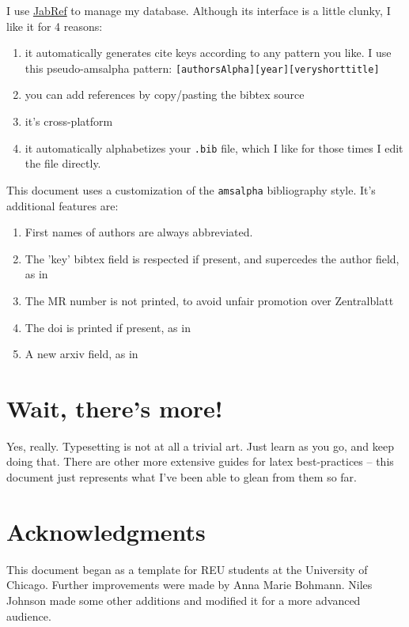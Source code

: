 \documentclass[11pt,oneside,draft]{amsart}
\begin{document}
I use \href{http://jabref.sourceforge.net/}{JabRef} to manage my
database.  Although its interface is a little clunky, I like it for 4 reasons:
\begin{enumerate}
\item it automatically generates cite keys according to any pattern
  you like.  I use this pseudo-amsalpha pattern: \texttt{[authorsAlpha][year][veryshorttitle]}
\item you can add references by copy/pasting the bibtex source
\item it's cross-platform
\item it automatically alphabetizes your \texttt{.bib} file, which I
  like for those times I edit the file directly.
\end{enumerate}

This document uses a customization of the \texttt{amsalpha}
bibliography style.  It's additional features are:
\begin{enumerate}
\item First names of authors are always abbreviated.
\item The 'key' bibtex field is respected if present, and supercedes
  the author field, as in \cite{ATC,Sage}
\item The MR number is not printed, to avoid unfair promotion over
  Zentralblatt
\item The doi is printed if present, as in \cite{JN2010Complex}
\item A new arxiv field, as in \cite{GO2012Infinite,JN2010Complex}
\end{enumerate}
 

\section{Wait, there's more!}

Yes, really.  Typesetting is not at all a trivial art.  Just learn as
you go, and keep doing that.  There are other more extensive guides
for latex best-practices -- this document just represents what I've
been able to glean from them so far.

\section*{Acknowledgments}  

This document began as a template for REU students at the University
of Chicago.  Further improvements were made by Anna Marie Bohmann.
Niles Johnson made some other additions and modified it for a more
advanced audience.


%
\end{document}
